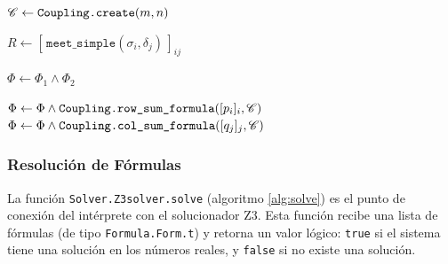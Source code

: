 \begin{algorithm}[H]
\caption{Patrón común para operaciones sobre tipos de distribución}
\label{alg:typeop}

$\mathscr{C} \leftarrow \texttt{Coupling.create}(m,n)$ 

{$R \leftarrow [\,\texttt{meet\_simple}(\sigma_i,\delta_j)\,]_{ij}$}


\BlankLine


$\Phi \leftarrow \Phi_1 \land \Phi_2$ 

$\Phi \leftarrow \Phi \land \texttt{Coupling.row\_sum\_formula}([p_i]_i,\mathscr{C})$\;
$\Phi \leftarrow \Phi \land \texttt{Coupling.col\_sum\_formula}([q_j]_j,\mathscr{C})$\;
\BlankLine

\end{algorithm}


\subsubsection{Resolución de Fórmulas}
\label{sec:impl-rutinas-solver}

La función \verb|Solver.Z3solver.solve| (algoritmo \ref{alg:solve}) es el punto de conexión del
intérprete con el solucionador Z3. Esta función recibe una lista de
fórmulas (de tipo \verb|Formula.Form.t|) y retorna un valor lógico:
\verb|true| si el sistema tiene una solución en los números reales, y
\verb|false| si no existe una solución.

